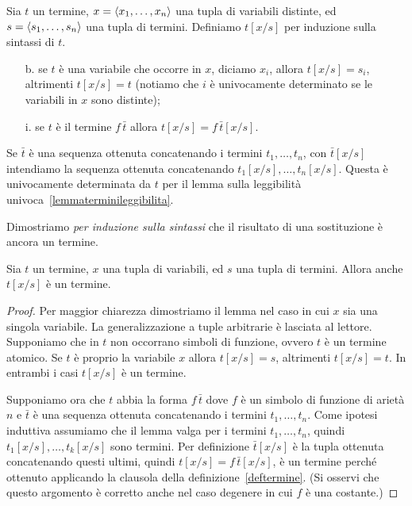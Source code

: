 \begin{definition}\label{defsostituzionetermini}
Sia $t$ un termine, $x=\langle x_1,\dots, x_n\rangle$ una tupla di variabili distinte, ed $s=\langle s_1,\dots,s_n\rangle$ una tupla di termini. Definiamo $t[x/s]$ per induzione sulla sintassi di $t$. 
\begin{itemize}
\item[b.] se $t$ \`e una variabile che occorre in $x$, diciamo $x_i$, allora $t[x/s]=s_i$, altrimenti $t[x/s]=t$ (notiamo che $i$ \`e univocamente determinato se le variabili in $x$ sono distinte);
\item[i.] se $t$ \`e il termine $f\,\bar t$ allora $t[x/s]=f\,\bar t[x/s]$.
\end{itemize} 
Se $\bar t$ \`e una sequenza ottenuta concatenando i termini $t_1,\dots,t_n$, con $\bar t[x/s]$ intendiamo la sequenza ottenuta concatenando $t_1[x/s],\dots,t_n[x/s]$. Questa \`e univocamente determinata da $t$ per il lemma sulla leggibilit\`a univoca~\ref{lemmaterminileggibilita}.\QED
\end{definition}

Dimostriamo \emph{per induzione sulla sintassi\/} che il risultato di una sostituzione \`e ancora un termine.
%
\begin{lemma}\label{terminisostituzione}
Sia $t$ un termine, $x$ una tupla di variabili, ed $s$ una tupla di termini. Allora anche $t[x/s]$ \`e un termine.
\end{lemma}
%
\begin{proof}
Per maggior chiarezza dimostriamo il lemma nel caso in cui $x$ sia una singola variabile. La generalizzazione a tuple arbitrarie \`e lasciata al lettore. Supponiamo che in $t$ non occorrano simboli di funzione, ovvero $t$ \`e un termine atomico. Se $t$ \`e proprio la variabile $x$ allora $t[x/s]=s$, altrimenti $t[x/s]=t$. In entrambi i casi $t[x/s]$ \`e un termine.

Supponiamo ora che $t$ abbia la forma $f\,\bar t$ dove $f$ \`e un simbolo di funzione di ariet\`a $n$ e $\bar t$ \`e una sequenza ottenuta concatenando i termini $t_1,\dots,t_n$. Come ipotesi induttiva assumiamo che il lemma valga per i termini $t_1,\dots,t_n$, quindi $t_1[x/s],\dots,t_k[x/s]$ sono termini.  Per definizione $\bar t[x/s]$ \`e la tupla ottenuta concatenando questi ultimi, quindi $t[x/s]=f\,\bar t[x/s]$, \`e un termine perch\'e ottenuto applicando la clausola  della definizione~\ref{deftermine}. (Si osservi che questo argomento \`e corretto anche nel caso degenere in cui $f$ \`e una costante.)
\end{proof}

